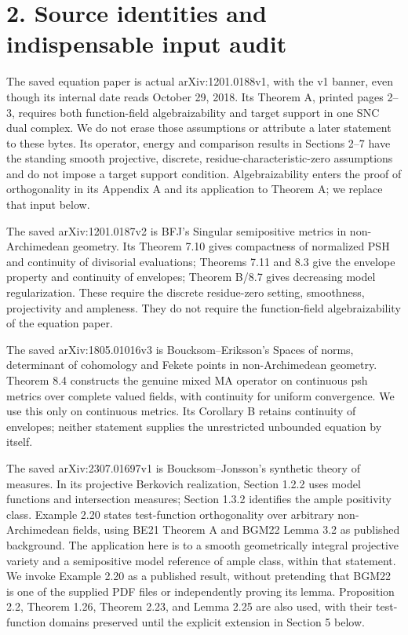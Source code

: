 \documentclass[11pt]{article}
\begin{document}
\section*{2. Source identities and indispensable input audit}

The saved equation paper is actual arXiv:1201.0188v1, with the v1 banner, even though its internal date reads October 29, 2018. Its Theorem A, printed pages 2--3, requires both function-field algebraizability and target support in one SNC dual complex. We do not erase those assumptions or attribute a later statement to these bytes. Its operator, energy and comparison results in Sections 2--7 have the standing smooth projective, discrete, residue-characteristic-zero assumptions and do not impose a target support condition. Algebraizability enters the proof of orthogonality in its Appendix A and its application to Theorem A; we replace that input below.

The saved arXiv:1201.0187v2 is BFJ's Singular semipositive metrics in non-Archimedean geometry. Its Theorem 7.10 gives compactness of normalized PSH and continuity of divisorial evaluations; Theorems 7.11 and 8.3 give the envelope property and continuity of envelopes; Theorem B/8.7 gives decreasing model regularization. These require the discrete residue-zero setting, smoothness, projectivity and ampleness. They do not require the function-field algebraizability of the equation paper.

The saved arXiv:1805.01016v3 is Boucksom--Eriksson's Spaces of norms, determinant of cohomology and Fekete points in non-Archimedean geometry. Theorem 8.4 constructs the genuine mixed MA operator on continuous psh metrics over complete valued fields, with continuity for uniform convergence. We use this only on continuous metrics. Its Corollary B retains continuity of envelopes; neither statement supplies the unrestricted unbounded equation by itself.

The saved arXiv:2307.01697v1 is Boucksom--Jonsson's synthetic theory of measures. In its projective Berkovich realization, Section 1.2.2 uses model functions and intersection measures; Section 1.3.2 identifies the ample positivity class. Example 2.20 states test-function orthogonality over arbitrary non-Archimedean fields, using BE21 Theorem A and BGM22 Lemma 3.2 as published background. The application here is to a smooth geometrically integral projective variety and a semipositive model reference of ample class, within that statement. We invoke Example 2.20 as a published result, without pretending that BGM22 is one of the supplied PDF files or independently proving its lemma. Proposition 2.2, Theorem 1.26, Theorem 2.23, and Lemma 2.25 are also used, with their test-function domains preserved until the explicit extension in Section 5 below.
\end{document}
